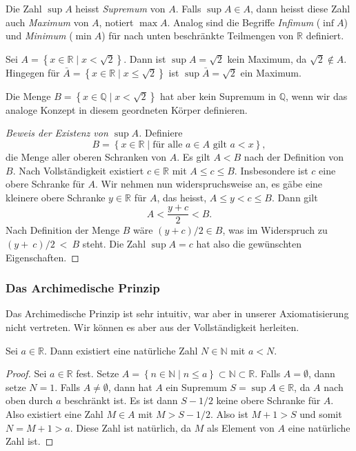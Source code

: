 \documentclass[../main.tex]{subfiles}
\begin{document}
Die Zahl $\sup A$ heisst \emph{Supremum} von $A$. Falls
$\sup A \in A$, dann heisst diese Zahl auch \emph{Maximum} von $A$,
notiert $\max A$.
Analog sind die Begriffe \emph{Infimum} ($\inf A$) und
\emph{Minimum} ($\min A$) für nach unten beschränkte
Teilmengen von $\mathbb{R}$ definiert.
 
\begin{example}
  Sei $A = \left\{x \in \mathbb{R} \mid x < \sqrt 2\right\}$.
  Dann ist $\sup A = \sqrt 2$ kein Maximum, da $\sqrt 2 \notin A$.
  Hingegen für 
  $\bar A = \left\{x \in \mathbb{R} \mid x \leq \sqrt 2\right\}$
  ist $\sup \bar A = \sqrt 2$ ein Maximum.

  Die Menge $B = \left\{x \in \mathbb{Q} \mid x < \sqrt 2\right\}$
  hat aber kein Supremum in $\mathbb{Q}$, wenn wir das analoge
  Konzept in diesem 
  geordneten Körper definieren. 
\end{example}

\begin{proof}[Beweis der Existenz von $\sup A$]
  Definiere
  \[
	  B = \left\{x \in \mathbb{R} \mid \text{für alle } a \in A
  \text{ gilt } a < x\right\},
  \]
  die Menge aller oberen Schranken von $A$. Es gilt $A < B$
  nach der Definition von $B$.
  Nach Vollständigkeit existiert $c \in \mathbb{R}$
  mit $A \leq c \leq B$.
  Insbesondere ist $c$ eine obere Schranke für $A$.
  Wir nehmen nun widerspruchsweise an, es gäbe eine
  kleinere obere Schranke $y \in \mathbb{R}$ für $A$,
  das heisst, $A \leq y < c \leq B$.
  Dann gilt
  \[
    A < \frac{y + c}{2} < B.
  \]
  Nach Definition der Menge $B$ wäre
  $(y + c)/2 \in B$, was im Widerspruch zu $(y +~c)/2~<~B$ steht.
  Die Zahl $\sup A = c$ hat also die gewünschten Eigenschaften.
\end{proof}

\subsubsection*{Das Archimedische Prinzip}
Das Archimedische Prinzip ist sehr intuitiv, war aber in
unserer Axiomatisierung nicht vertreten. Wir können
es aber aus der Vollständigkeit herleiten.

\begin{archimedes}
  Sei $a \in \mathbb{R}$. Dann existiert eine natürliche
  Zahl $N \in \mathbb{N}$ mit $a < N$.
\end{archimedes}

\begin{proof}
  Sei $a \in \mathbb{R}$ fest. Setze
  \(
    A = \left\{n \in \mathbb{N} \mid n \leq a\right\} \subset \mathbb{N}
    \subset \mathbb{R}.
  \)
  Falls $A = \emptyset$, dann setze $N = 1$.
  Falls $A \neq \emptyset$, dann hat $A$ ein Supremum
  $S = \sup A \in \mathbb{R}$, da $A$ nach oben 
  durch $a$ beschränkt ist.
  Es ist dann $S - 1/2$ keine obere Schranke für $A$. 
  Also existiert eine Zahl $M \in A$ mit $M > S - 1/2$.
  Also ist $M + 1 > S$ und somit $N = M + 1 > a$. Diese Zahl ist
  natürlich, da $M$ als Element von $A$ eine natürliche Zahl ist.
\end{proof}
\end{document}
